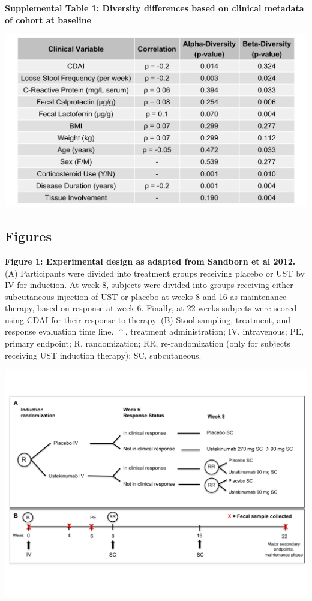 \documentclass[12pt,]{article}
\begin{document}
\newpage

\textbf{Supplemental Table 1: Diversity differences based on clinical
metadata of cohort at baseline}

\includegraphics{tables/Supp.table1_cohortdiversity.png}

\newpage

\subsection{Figures}\label{figures}

\textbf{Figure 1: Experimental design as adapted from Sandborn et al
2012.} (A) Participants were divided into treatment groups receiving
placebo or UST by IV for induction. At week 8, subjects were divided
into groups receiving either subcutaneous injection of UST or placebo at
weeks 8 and 16 as maintenance therapy, based on response at week 6.
Finally, at 22 weeks subjects were scored using CDAI for their response
to therapy. (B) Stool sampling, treatment, and response evaluation time
line. \(\uparrow\), treatment administration; IV, intravenous; PE,
primary endpoint; R, randomization; RR, re-randomization (only for
subjects receiving UST induction therapy); SC, subcutaneous.

\includegraphics{figures/Figure1_expdesign.pdf}
\end{document}
